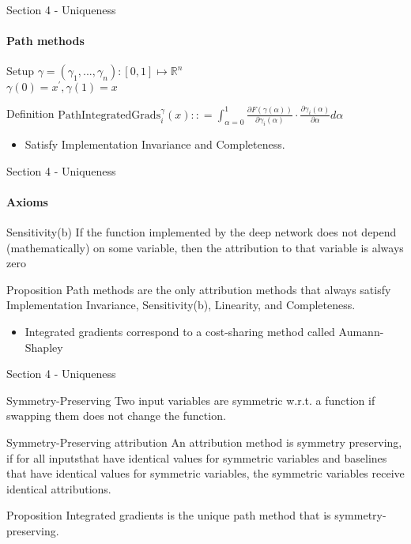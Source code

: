 \documentclass[serif]{beamer}
\begin{document}
\begin{frame}{Section 4 - Uniqueness}
	\framesubtitle{Path methods}
	\begin{block}{Setup}
		$\gamma = (\gamma_1, ..., \gamma_n) : [0,1] \mapsto \mathbb{R}^n  $ \\
		 $ \gamma(0) = x^\prime, \gamma(1) = x$
	\end{block}	
	\begin{block}{Definition}
		$\text{PathIntegratedGrads}_i^\gamma (x) :: = 	\int_{\alpha=0}^{1} \frac{\partial F(\gamma(\alpha))}{\partial \gamma_i(\alpha)} \cdot  \frac{\partial \gamma_i(\alpha)}{\partial \alpha} d \alpha$
	\end{block}	
	\begin{itemize}
		\item Satisfy Implementation Invariance and Completeness.
	\end{itemize}
\end{frame}


\begin{frame}{Section 4 - Uniqueness}
	\framesubtitle{Axioms}
	\begin{block}{Sensitivity(b)}
		If the function implemented by the deep network does not depend (mathematically) on some variable, then the attribution to that variable is always zero
	\end{block}	
	\begin{block}{Proposition}
		Path methods
		are the only attribution methods that always satisfy
		Implementation Invariance, Sensitivity(b), Linearity, and
		Completeness.
	\end{block}	
	\begin{itemize}
		\item Integrated gradients correspond to a cost-sharing method called Aumann-Shapley
	\end{itemize}
\end{frame}
\begin{frame}{Section 4 - Uniqueness}
	\begin{block}{Symmetry-Preserving}
		Two input variables are symmetric w.r.t. a function if swapping them does not change the function. 
	\end{block}	
	\begin{block}{Symmetry-Preserving attribution }
		An  attribution method is symmetry preserving, if for all inputsthat have identical values for symmetric variables and baselines
	that have identical values for symmetric variables, the
	symmetric variables receive identical attributions.
	\end{block}	
	\begin{block}{Proposition}
		Integrated gradients is the unique path method that is symmetry-preserving.
	\end{block}	
\end{frame}
\end{document}
